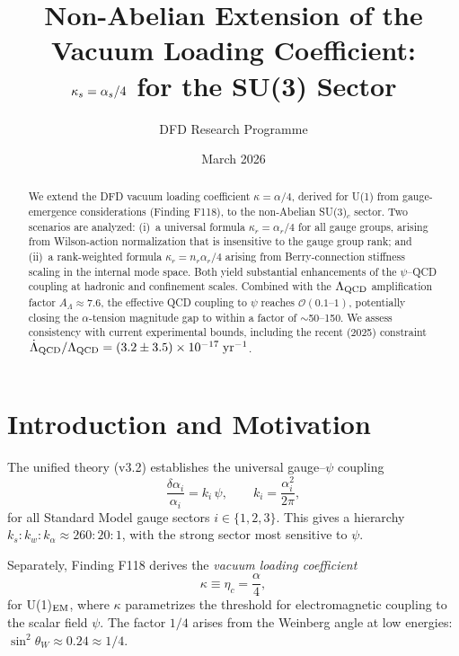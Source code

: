 \documentclass[11pt,letterpaper]{article}
\title{Non-Abelian Extension of the Vacuum Loading Coefficient:\\
$\kappa_s = \alphafine_s/4$ for the SU(3) Sector}
\author{DFD Research Programme}
\date{March 2026}
\newcommand{\alphafine}{\alpha}
\newcommand{\psifield}{\psi}
\newcommand{\kalpha}{k_\alpha}
\theoremstyle{definition}
\begin{document}
\maketitle

\begin{abstract}
We extend the DFD vacuum loading coefficient $\kappa = \alphafine/4$,
derived for U(1) from gauge-emergence considerations (Finding F118),
to the non-Abelian SU(3)$_c$ sector.  Two scenarios are analyzed:
(i)~a universal formula $\kappa_r = \alpha_r/4$ for all gauge groups,
arising from Wilson-action normalization that is insensitive to the
gauge group rank; and (ii)~a rank-weighted formula
$\kappa_r = n_r \alpha_r/4$ arising from Berry-connection stiffness
scaling in the internal mode space.  Both yield substantial
enhancements of the $\psi$--QCD coupling at hadronic and confinement
scales.  Combined with the $\Lambda_{\rm QCD}$ amplification factor
$A_\Lambda \approx 7.6$, the effective QCD coupling to $\psi$ reaches
$\mathcal{O}(0.1\text{--}1)$, potentially closing the $\alpha$-tension
magnitude gap to within a factor of $\sim$50--150.  We assess
consistency with current experimental bounds, including the recent
(2025) constraint $\dot{\Lambda}_{\rm QCD}/\Lambda_{\rm QCD} =
(3.2 \pm 3.5) \times 10^{-17}\;\mathrm{yr}^{-1}$.
\end{abstract}

\tableofcontents

\section{Introduction and Motivation}\label{sec:intro}

The unified theory (v3.2) establishes the universal gauge--$\psi$ coupling
\begin{equation}\label{eq:ki-universal}
\frac{\delta\alpha_i}{\alpha_i} = k_i\,\psifield, \qquad
k_i = \frac{\alpha_i^2}{2\pi},
\end{equation}
for all Standard Model gauge sectors $i \in \{1,2,3\}$.  This gives a
hierarchy $k_s : k_w : \kalpha \approx 260 : 20 : 1$, with the strong
sector most sensitive to $\psi$.

Separately, Finding F118 derives the \emph{vacuum loading coefficient}
\begin{equation}\label{eq:kappa-U1}
\kappa \equiv \eta_c = \frac{\alphafine}{4},
\end{equation}
for U(1)$_{\rm EM}$, where $\kappa$ parametrizes the threshold for
electromagnetic coupling to the scalar field $\psi$.  The factor $1/4$
arises from the Weinberg angle at low energies:
$\sin^2\theta_W \approx 0.24 \approx 1/4$.
\end{document}
